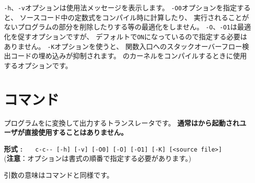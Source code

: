 \verb/-h/、\verb/-v/オプションは使用法メッセージを表示します。
\verb/-O0/オプションを指定すると、
ソースコード中の定数式をコンパイル時に計算したり、
実行されることがないプログラムの部分を削除したりする等の最適化をしません。
\verb/-O/、\verb/-O1/は最適化を促すオプションですが、
デフォルトで\verb/ON/になっているので指定する必要はありません。
\verb/-K/オプションを使うと、
関数入口へのスタックオーバーフロー検出コードの埋め込みが抑制されます。
\tacos のカーネルをコンパイルするときに使用するオプションです。

%
%

\section{{\ccmmc}コマンド}
\label{command:ccmmc}

{\cmm}プログラムを{\cl}に変換して出力するトランスレータです。
{\bf 通常は{\cmc}から起動されユーザが直接使用することはありません。}

\begin{flushleft}
{\bf 形式 : }~~~\verb/c-c-- [-h] [-v] [-O0] [-O] [-O1] [-K] [<source file>]/\\
({\bf 注意}：オプションは書式の順番で指定する必要があります。)
\end{flushleft}


引数の意味は{\cmmc}コマンドと同様です。


